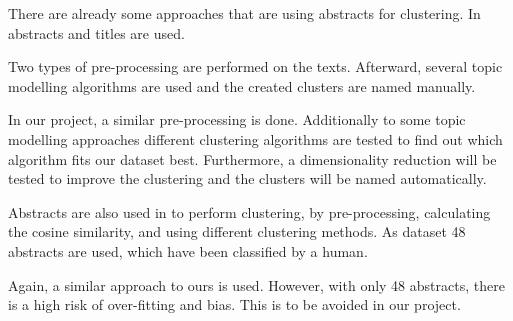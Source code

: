 There are already some approaches that are using abstracts for clustering.
In \cite{Clustering_scientific_documents_with_topic_modeling} abstracts and titles are used.

Two types of pre-processing are performed on the texts. 
Afterward, several topic modelling algorithms are used and the created clusters are named manually.

In our project, a similar pre-processing is done.
Additionally to some topic modelling approaches different clustering algorithms are tested to find out which algorithm fits our dataset best. 
Furthermore, a dimensionality reduction will be tested to improve the clustering and the clusters will be named automatically.

Abstracts are also used in \cite{An_Approach_to_Clustering_Abstracts} to perform clustering, by pre-processing, calculating the cosine similarity, and using different clustering methods.
As dataset 48 abstracts are used, which have been classified by a human.

Again, a similar approach to ours is used. However, with only 48 abstracts, there is a high risk of over-fitting and bias.
This is to be avoided in our project.